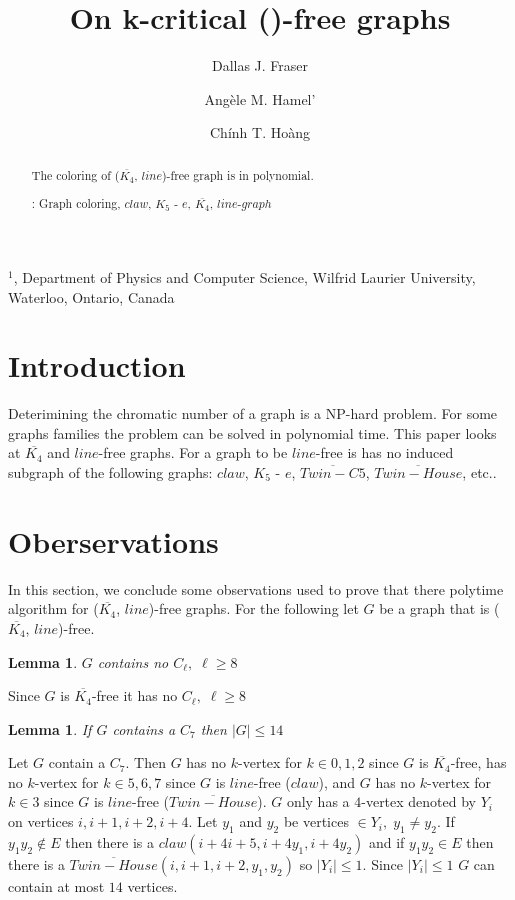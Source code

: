 \documentclass[12pt]{article}
\title{On k-critical ({\FAM})-free graphs}
\author{
	Dallas J. Fraser\inst{1}
	\and Ang\`ele M. Hamel'\inst{1}
	\and Ch\'inh T. Ho\`ang\inst{1}
}
\newtheorem{Lemma}[Theorem]{Lemma}
\def\inst#1{$^{#1}$}
\def\FAM{($\overline{K_4}$, $line$)}
\begin{document}
\maketitle

\begin{center}
{\footnotesize

\inst{1}, Department of Physics and Computer Science, Wilfrid Laurier
University, \\Waterloo, Ontario, Canada}

\end{center}

\begin{abstract}
The coloring of {\FAM}-free graph is in polynomial.

: Graph coloring, $claw$, $K_5$ - $e$, $\overline{K_4}$, $line$-$graph$ 
\end{abstract}


\section{Introduction}\label{sec:intro}
Deterimining the chromatic number of a graph is a NP-hard problem. For some graphs families the problem can be solved in polynomial time. This paper looks at $\overline{K_4}$ and $line$-free graphs. For a graph to be $line$-free is has no induced subgraph of the following graphs: $claw$, $K_5$ - $e$, $\overline{Twin-C5}$, $\overline{Twin-House}$, etc..


\section{Oberservations}\label{sec:observations}
In this section, we conclude some observations used to prove that there polytime algorithm for {\FAM}-free graphs. For the following let $G$ be a graph that is {\FAM}-free.

\begin{Lemma}\label{lem:cl-free}
$G$ contains no $C_\ell,\; \ell \geq 8$
\end{Lemma}
 Since $G$ is $\overline{K_4}$-free it has no $C_\ell,\; \ell \geq 8$

\begin{Lemma}\label{lem:c7-bounded}
If $G$ contains a $C_7$ then $|G| \leq 14$
\end{Lemma}
 Let $G$ contain a $C_7$. Then $G$ has no $k$-vertex for $k \in {0, 1, 2}$ since $G$ is $\overline{K_4}$-free, has no $k$-vertex for $k \in {5, 6,7}$ since $G$ is $line$-free ($claw$), and $G$ has no $k$-vertex for $k \in {3}$ since $G$ is $line$-free ($\overline{Twin-House}$). $G$ only has a $4$-vertex denoted by $Y_i$ on vertices $i,i+1,i+2,i+4$. Let $y_1$ and $y_2$ be vertices $\in Y_i,\; y_1 \neq y_2$. If $y_1y_2 \not \in E$ then there is a $claw (i+4i+5,i+4y_1,i+4y_2)$ and if $y_1y_2 \in E$ then there is a $\overline{Twin-House}(i,i+1,i+2,y_1,y_2)$ so $|Y_i| \leq 1$. Since $|Y_i| \leq 1$ $G$ can contain at most $14$ vertices.
\end{document}
